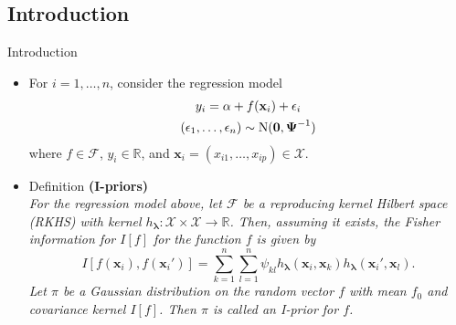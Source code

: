\documentclass{beamer}\usepackage[]{graphicx}\usepackage[]{color}
\newcommand{\N}{\text{\normalfont N}}
\begin{document}

\subsection{Introduction}

\begin{frame}{Introduction}
	\vspace{-4mm}

	\begin{itemize}
		\item For $i = 1, \dots, n$, consider the regression model
		\begin{align*}
			\begin{gathered}
				y_i = \alpha + f(\mathbf x_i) + \epsilon_i \\
				(\epsilon_1, \dots, \epsilon_n) \sim \N(\mathbf 0, \boldsymbol{\Psi}^{-1})
			\end{gathered}
		\end{align*}
		where $f \in \mathcal F$, $y_i \in \mathbb R$, and $\mathbf x_i = (x_{i1}, \dots, x_{ip}) \in \mathcal X$.

	\pause
	\item Definition \textbf{(I-priors)} \\
	\textit{For the regression model above, let $\mathcal F$ be a reproducing kernel Hilbert space (RKHS) with kernel $h_{\boldsymbol\lambda}: \mathcal X \times \mathcal X \rightarrow \mathbb R$. Then, assuming it exists, the Fisher information for $I[f]$ for the function $f$ is given by
		\[
		I[f(\mathbf x_i), f(\mathbf x_i')] = \sum_{k=1}^n \sum_{l=1}^n \psi_{kl} h_{\boldsymbol\lambda}(\mathbf x_i, \mathbf x_k) h_{\boldsymbol\lambda}(\mathbf x_i', \mathbf x_l).
		\]
		Let $\pi$ be a Gaussian distribution on the random vector $f$ with mean $f_0$ and covariance kernel $I[f]$. Then $\pi$ is called an I-prior for $f$.
	}
	\end{itemize}
\end{frame}
\end{document}
